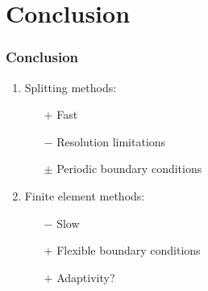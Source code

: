\section{Conclusion}
\begin{frame}
\frametitle{Conclusion}
\Large
\begin{enumerate}
    \item Splitting methods:
    \begin{enumerate}
        \large
        \item[$+$] Fast
        \item[$-$] Resolution limitations
        \item[$\pm$] Periodic boundary conditions
    \end{enumerate}
    \pause
    \vspace{0.5cm}
    \item Finite element methods:
    \begin{enumerate}
        \large
        \item[$-$] Slow
        \item[$+$] Flexible boundary conditions
        \item[$+$] Adaptivity?
    \end{enumerate}
\end{enumerate}
\end{frame}



